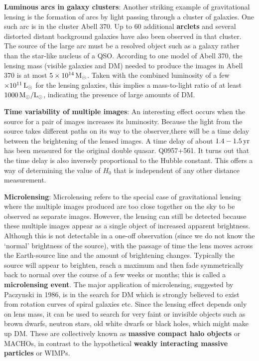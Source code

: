 \documentclass[a4paper,10pt]{article}
\begin{document}
{\noindent}\textbf{Luminous arcs in galaxy clusters}: Another striking example of gravitational lensing is the formation of arcs by light passing through a cluster of galaxies. One such arc is in the cluster Abell 370. Up to $60$ additional \textbf{arclets} and several distorted distant background galaxies have also been observed in that cluster. The source of the large arc must be a resolved object such as a galaxy rather than the star-like nucleus of a QSO. According to one model of Abell 370, the lensing mass (visible galaxies and DM) needed to produce the images in Abell 370 is at most $5\times10^{14}\,{\rm M_\odot}$. Taken with the combined luminosity of a few $\times10^{11}\,{\rm L_\odot}$ for the lensing galaxies, this implies a mass-to-light ratio of at least $1000\,{\rm M_\odot/L_\odot}$, indicating the presence of large amounts of DM.

{\noindent}\textbf{Time variability of multiple images}: An interesting effect occurs when the source for a pair of images increases its luminosity. Because the light from the source takes different paths on its way to the observer,there will be a time delay between the brightening of the lensed images. A time delay of about $1.4-1.5\,{\rm yr}$ has been measured for the original double quasar. Q0957+561. It turns out that the time delay is also inversely proportional to the Hubble constant. This offers a way of determining the value of $H_0$ that is independent of any other distance measurement. 

{\noindent}\textbf{Microlensing}: Microlensing refers to the special case of gravitational lensing where the multiple images produced are too close together on the sky to be observed as separate images. However, the lensing can still be detected because these multiple images appear as a single object of increased apparent brightness. Although this is not detectable in a one-off observation (since we do not know the `normal' brightness of the source), with the passage of time the lens moves across the Earth-source line and the amount of brightening changes. Typically the source will appear to brighten, reach a maximum and then fade symmetrically back to normal over the course of a few weeks or months; this is called a \textbf{microlensing event}. The major application of microlensing, suggested by Paczynski in 1986, is in the search for DM which is strongly believed to exist from rotation curves of spiral galaxies etc. Since the lensing effect depends only on lens mass, it can be used to search for very faint or invisible objects such as brown dwarfs, neutron stars, old white dwarfs or black holes, which might make up DM. These are collectively known as \textbf{massive compact halo objects} or MACHOs, in contrast to the hypothetical \textbf{weakly interacting massive particles} or WIMPs.
\end{document}

